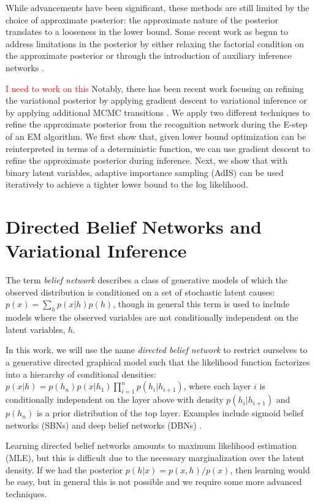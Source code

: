 \documentclass{article} %
\newcommand{\alert}[1]{\textcolor{red}{#1}}
\begin{document}
While advancements have been significant, these methods are still limited by the choice of approximate posterior: the approximate nature of the posterior translates to a looseness in the lower bound. Some recent work as begun to address limitations in the posterior by either relaxing the factorial condition \citep{burda2015importance} on the approximate posterior or through the introduction of auxiliary inference networks \citep{rezende2015variational}. 

\alert{I need to work on this} Notably, there has been recent work focusing on refining the variational posterior by applying gradient descent to variational inference \citep{hoffman2013stochastic} or by applying additional MCMC transitions \citep{salimans2014markov}. We apply two different techniques to refine the approximate posterior from the recognition network during the E-step of an EM algorithm. We first show that, given lower bound optimization can be reinterpreted in terms of a deterministic function, we can use gradient descent to refine the approximate posterior during inference. Next, we show that with binary latent variables, adaptive importance sampling (AdIS) \citep{karamchandani1989adaptive} can be used iteratively to achieve a tighter lower bound to the log likelihood.

\section{Directed Belief Networks and Variational Inference}
The term \emph{belief network} describes a class of generative models of which the observed distribution is conditioned on a set of stochastic latent causes: $p(x) = \sum_h p(x|h) p(h)$, though in general this term is used to include models where the observed variables are not conditionally independent on the latent variables, $h$. 

In this work, we will use the name \emph{directed belief network} to restrict ourselves to a generative directed graphical model such that the likelihood function factorizes into a hierarchy of conditional densities: $p(x | h) = p(h_n) p(x|h_1) \prod_{i=1}^n p(h_{i}|h_{i+1})$, where each layer $i$ is conditionally independent on the layer above with density $p(h_{i}|h_{i + 1})$ and $p(h_n)$ is a prior distribution of the top layer. Examples include sigmoid belief networks (SBNs) and deep belief networks (DBNs) \citep{hinton2006fast}.

Learning directed belief networks amounts to maximum likelihood estimation (MLE), but this is difficult due to the necessary marginalization over the latent density. If we had the posterior $p(h|x) = p(x, h) / p(x)$, then learning would be easy, but in general this is not possible and we require some more advanced techniques. 
\end{document}
